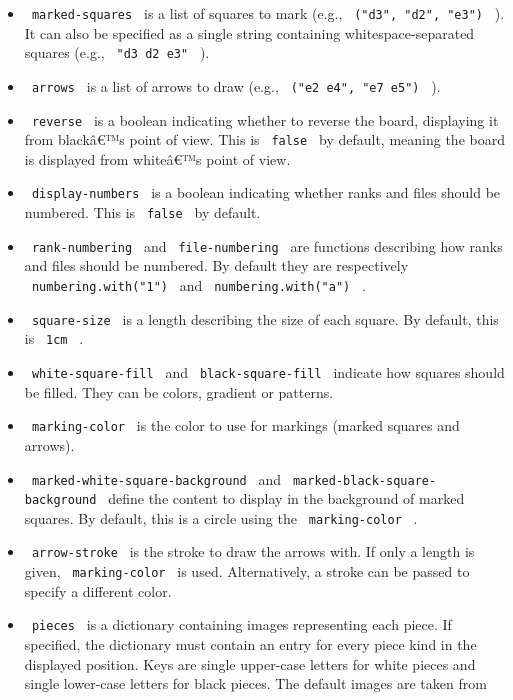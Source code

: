\begin{itemize}
\item
  \texttt{\ marked-squares\ } is a list of squares to mark (e.g.,
  \texttt{\ ("d3",\ "d2",\ "e3")\ } ). It can also be specified as a
  single string containing whitespace-separated squares (e.g.,
  \texttt{\ "d3\ d2\ e3"\ } ).
\item
  \texttt{\ arrows\ } is a list of arrows to draw (e.g.,
  \texttt{\ ("e2\ e4",\ "e7\ e5")\ } ).
\item
  \texttt{\ reverse\ } is a boolean indicating whether to reverse the
  board, displaying it from blackâ€™s point of view. This is
  \texttt{\ false\ } by default, meaning the board is displayed from
  whiteâ€™s point of view.
\item
  \texttt{\ display-numbers\ } is a boolean indicating whether ranks and
  files should be numbered. This is \texttt{\ false\ } by default.
\item
  \texttt{\ rank-numbering\ } and \texttt{\ file-numbering\ } are
  functions describing how ranks and files should be numbered. By
  default they are respectively \texttt{\ numbering.with("1")\ } and
  \texttt{\ numbering.with("a")\ } .
\item
  \texttt{\ square-size\ } is a length describing the size of each
  square. By default, this is \texttt{\ 1cm\ } .
\item
  \texttt{\ white-square-fill\ } and \texttt{\ black-square-fill\ }
  indicate how squares should be filled. They can be colors, gradient or
  patterns.
\item
  \texttt{\ marking-color\ } is the color to use for markings (marked
  squares and arrows).
\item
  \texttt{\ marked-white-square-background\ } and
  \texttt{\ marked-black-square-background\ } define the content to
  display in the background of marked squares. By default, this is a
  circle using the \texttt{\ marking-color\ } .
\item
  \texttt{\ arrow-stroke\ } is the stroke to draw the arrows with. If
  only a length is given, \texttt{\ marking-color\ } is used.
  Alternatively, a stroke can be passed to specify a different color.
\item
  \texttt{\ pieces\ } is a dictionary containing images representing
  each piece. If specified, the dictionary must contain an entry for
  every piece kind in the displayed position. Keys are single upper-case
  letters for white pieces and single lower-case letters for black
  pieces. The default images are taken from

\end{itemize}
